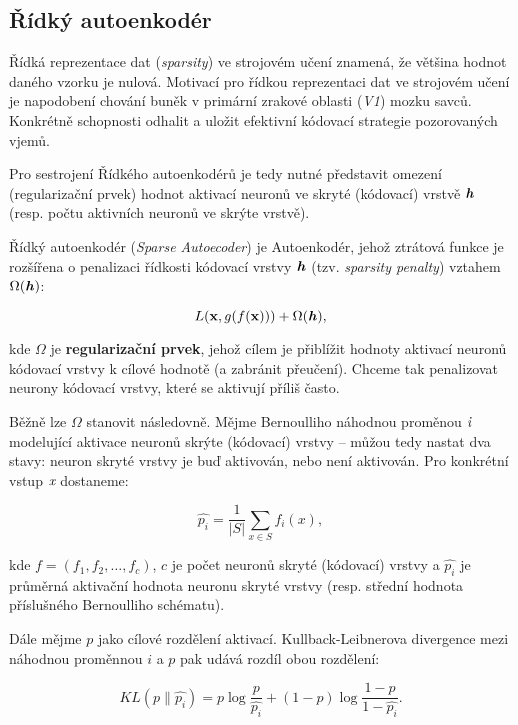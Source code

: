 \subsection{Řídký autoenkodér}
\label{sec:sparse_autoencoder}
Řídká reprezentace dat (\emph{sparsity}) ve strojovém učení znamená, že většina hodnot daného vzorku je nulová. 
Motivací pro řídkou reprezentaci dat ve strojovém učení je napodobení chování buněk v primární zrakové oblasti (\emph{V1}) mozku savců.
Konkrétně schopnosti odhalit a uložit efektivní kódovací strategie pozorovaných vjemů. 

Pro sestrojení Řídkého autoenkodérů je tedy nutné představit omezení (regularizační prvek) hodnot aktivací neuronů ve skryté (kódovací) vrstvě $\textbf{\emph{h}}$ (resp. počtu aktivních neuronů ve skrýte vrstvě).

Řídký autoenkodér (\emph{Sparse Autoecoder}) je Autoenkodér, jehož ztrátová funkce je rozšířena o penalizaci řídkosti kódovací vrstvy $\textbf{\emph{h}}$ (tzv. \emph{sparsity penalty}) vztahem $\Omega(\textbf{\emph{h}})$:

\begin{equation}
    L(\mathbf{x}, g(f(\mathbf{x}))) + \Omega(\textbf{\emph{h}}),
\end{equation}

kde $\Omega$ je \textbf{regularizační prvek}, jehož cílem je přiblížit hodnoty aktivací neuronů kódovací vrstvy k cílové hodnotě (a zabránit přeučení).
Chceme tak penalizovat neurony kódovací vrstvy, které se aktivují příliš často.

Běžně lze $\Omega$ stanovit následovně. Mějme Bernoulliho náhodnou proměnou $\emph{i}$ modelující aktivace neuronů skrýte (kódovací) vrstvy – můžou tedy nastat dva stavy: neuron skryté vrstvy je buď aktivován, nebo není aktivován.
Pro konkrétní vstup $\emph{x}$ dostaneme:

\begin{equation}
    \hat{p_i} = \frac{1}{|S|}\sum_{x \in S}^{}f_i(x),
\end{equation}

kde $ f = (f_1, f_2, \dots, f_c)$, $c$ je počet neuronů skryté (kódovací) vrstvy a $\hat{p_i}$ je průměrná aktivační hodnota neuronu skryté vrstvy (resp. střední hodnota příslušného Bernoulliho schématu).

Dále mějme $p$ jako cílové rozdělení aktivací.
Kullback-Leibnerova divergence mezi náhodnou proměnnou $i$ a $p$ pak udává rozdíl obou rozdělení:

\begin{equation}
    KL(p \parallel \hat{p_i}) = p \log \frac{p}{\hat{p_i}} + (1 - p) \log \frac{1 - p}{1 - \hat{p_i}}.
\end{equation}

